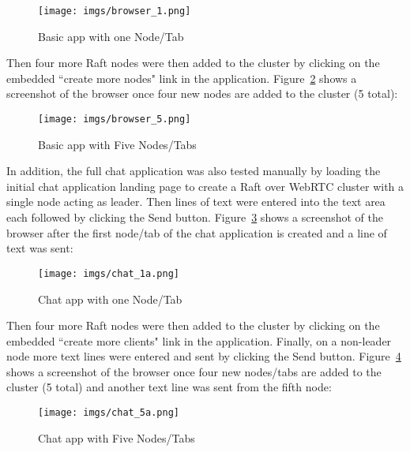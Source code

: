 \documentclass[conference,compsoc]{./IEEEtran/IEEEtran}
\begin{document}
\begin{figure}[!t]
    \centering
    \texttt{[image: imgs/browser\_1.png]}
    \caption{Basic app with one Node/Tab}
    \label{fig:browser_1}
\end{figure}

Then four more Raft nodes were then added to the cluster by clicking
on the embedded ``create more nodes" link in the application.
Figure~\ref{fig:browser_5} shows a screenshot of the browser once four
new nodes are added to the cluster (5 total):

\begin{figure}[!t]
    \centering
    \texttt{[image: imgs/browser\_5.png]}
    \caption{Basic app with Five Nodes/Tabs}
    \label{fig:browser_5}
\end{figure}

In addition, the full chat application was also tested manually by
loading the initial chat application landing page to create a Raft
over WebRTC cluster with a single node acting as leader. Then lines
of text were entered into the text area each followed by clicking the
Send button. Figure~\ref{fig:browser_chat_1} shows a screenshot of the
browser after the first node/tab of the chat application is created
and a line of text was sent:

\begin{figure}[!t]
    \centering
    \texttt{[image: imgs/chat\_1a.png]}
    \caption{Chat app with one Node/Tab}
    \label{fig:browser_chat_1}
\end{figure}

Then four more Raft nodes were then added to the cluster by clicking
on the embedded ``create more clients" link in the application.
Finally, on a non-leader node more text lines were entered and sent by
clicking the Send button. Figure~\ref{fig:browser_chat_5} shows
a screenshot of the browser once four new nodes/tabs are added to the
cluster (5 total) and another text line was sent from the fifth node:

\begin{figure}[!t]
    \centering
    \texttt{[image: imgs/chat\_5a.png]}
    \caption{Chat app with Five Nodes/Tabs}
    \label{fig:browser_chat_5}
\end{figure}
\end{document}
